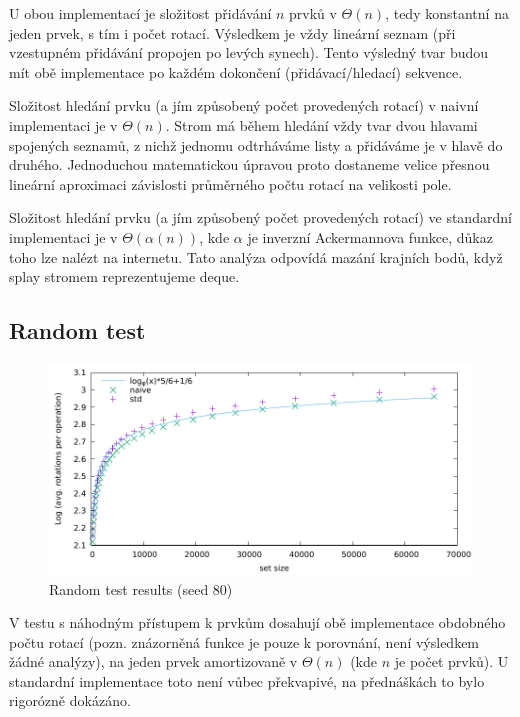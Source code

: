 \documentclass[a4paper,12pt]{article} %
\begin{document}
U obou implementací je složitost přidávání $n$ prvků v $\Theta(n)$, tedy konstantní na jeden prvek, s tím i počet rotací. Výsledkem je vždy lineární seznam (při vzestupném přidávání propojen po levých synech). Tento výsledný tvar budou mít obě implementace po každém dokončení (přidávací/hledací) sekvence.

Složitost hledání prvku (a jím způsobený počet provedených rotací) v naivní implementaci je v $\Theta(n)$. Strom má během hledání vždy tvar dvou hlavami spojených seznamů, z nichž jednomu odtrháváme listy a přidáváme je v hlavě do druhého. Jednoduchou matematickou úpravou proto dostaneme velice přesnou lineární aproximaci závislosti průměrného počtu rotací na velikosti pole.

Složitost hledání prvku (a jím způsobený počet provedených rotací) ve standardní implementaci je v $\Theta(\alpha(n))$, kde $\alpha$ je inverzní Ackermannova funkce, důkaz toho lze nalézt na internetu. Tato analýza odpovídá mazání krajních bodů, když splay stromem reprezentujeme deque.

\pagebreak

\subsection*{Random test}

\begin{figure}[!htb]
    \caption{Random test results (seed 80)}
    \label{rng_results}
    \includegraphics{random.pdf}    
\end{figure}

V testu s náhodným přístupem k prvkům dosahují obě implementace obdobného počtu rotací (pozn. znázorněná funkce je pouze k porovnání, není výsledkem žádné analýzy), na jeden prvek amortizovaně v $\Theta(n)$ (kde $n$ je počet prvků). U standardní implementace toto není vůbec překvapivé, na přednáškách to bylo rigorózně dokázáno.
\end{document}
